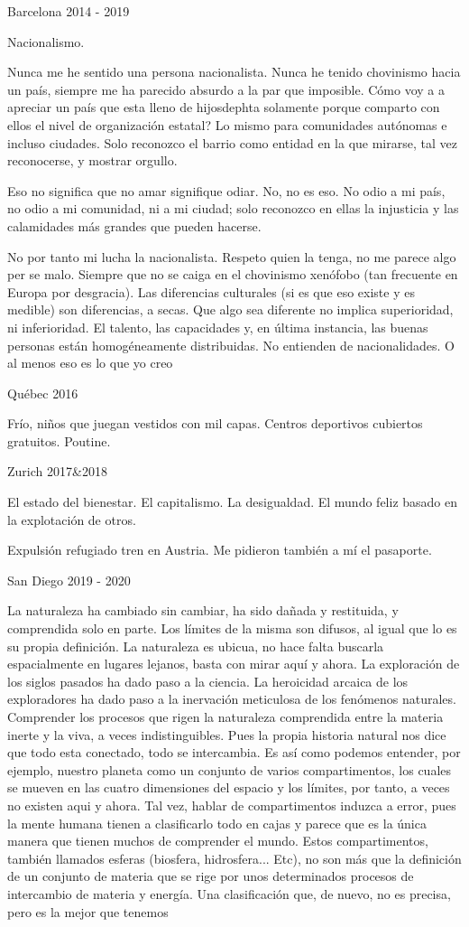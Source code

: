 \documentclass[ebook,11pt,oneside,openany]{memoir}
\begin{document}
Barcelona 2014 - 2019

Nacionalismo.

Nunca me he sentido una persona nacionalista. Nunca he tenido chovinismo hacia un país, siempre me ha parecido absurdo a la par que imposible. Cómo voy a a apreciar un país que esta lleno de hijosdephta solamente porque comparto con ellos el nivel de organización estatal? Lo mismo para comunidades autónomas e incluso ciudades. Solo reconozco el barrio como entidad en la que mirarse, tal vez reconocerse, y mostrar orgullo.

Eso no significa que no amar signifique odiar. No, no es eso. No odio a mi país, no odio a mi comunidad, ni a mi ciudad; solo reconozco en ellas la injusticia y las calamidades más grandes que pueden hacerse.

No por tanto mi lucha la nacionalista. Respeto quien la tenga, no me parece algo per se malo. Siempre que no se caiga en el chovinismo xenófobo (tan frecuente en Europa por desgracia). Las diferencias culturales (si es que eso existe y es medible) son diferencias, a secas. Que algo sea diferente no implica superioridad, ni inferioridad. El talento, las capacidades y, en última instancia, las buenas personas están homogéneamente distribuidas. No entienden de nacionalidades. O al menos eso es lo que yo creo 

Québec 2016

Frío, niños que juegan vestidos con mil capas. Centros deportivos cubiertos gratuitos. Poutine.

Zurich 2017&2018

El estado del bienestar. El capitalismo. La desigualdad. El mundo feliz basado en la explotación de otros. 

Expulsión refugiado tren en Austria. Me pidieron también a mí el pasaporte.

San Diego 2019 - 2020

La naturaleza ha cambiado sin cambiar, ha sido dañada y restituida, y comprendida solo en parte. Los límites de la misma son difusos, al igual que lo es su propia definición. La naturaleza es ubicua, no hace falta buscarla espacialmente en lugares lejanos, basta con mirar aquí y ahora. La exploración de los siglos pasados ha dado paso a la ciencia. La heroicidad arcaica de los exploradores ha dado paso a la inervación meticulosa de los fenómenos naturales. Comprender los procesos que rigen la naturaleza comprendida entre la materia inerte y la viva, a veces indistinguibles. Pues la propia historia natural nos dice que todo esta conectado, todo se intercambia. Es así como podemos entender, por ejemplo, nuestro planeta como un conjunto de varios compartimentos, los cuales se mueven en las cuatro dimensiones del espacio y los límites, por tanto, a veces no existen aqui y ahora. Tal vez, hablar de compartimentos induzca a error, pues la mente humana tienen a clasificarlo todo en cajas y parece que es la única manera que tienen muchos de comprender el mundo. Estos compartimentos, también llamados esferas (biosfera, hidrosfera... Etc), no son más que la definición de un conjunto de materia que se rige por unos determinados procesos de intercambio de materia y energía. Una clasificación que, de nuevo, no es precisa, pero es la mejor que tenemos 
\end{document}
